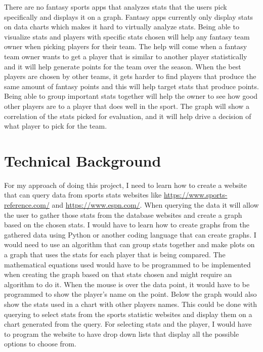 \documentclass[10pt,twocolumn,letterpaper]{article}
\begin{document}
There are no fantasy sports apps that analyzes stats that the users pick specifically and displays it on a graph. Fantasy apps currently only display stats on data charts which makes it hard to virtually analyze stats. Being able to visualize stats and players with specific stats chosen will help any fantasy team owner when picking players for their team. The help will come when a fantasy team owner wants to get a player that is similar to another player statistically and it will help generate points for the team over the season. When the best players are chosen by other teams, it gets harder to find players that produce the same amount of fantasy points and this will help target stats that produce points. Being able to group important stats together will help the owner to see how good other players are to a player that does well in the sport. The graph will show a correlation of the stats picked for evaluation, and it will help drive a decision of what player to pick for the team. 

\section{Technical Background}
\label{sec:tech background}

For my approach of doing this project, I need to learn how to create a website that can query data from sports stats websites like \url{https://www.sports-reference.com/} and
\url{https://www.espn.com/}. When querying the data it will allow the user to gather those stats from the database websites and create a graph based on the chosen stats. I would have to learn how to create graphs from the gathered data using Python or another coding language that can create graphs. I would need to use an algorithm that can group stats together and make plots on a graph that uses the stats for each player that is being compared. The mathematical equations used would have to be programmed to be implemented when creating the graph based on that stats chosen and might require an algorithm to do it. When the mouse is over the data point, it would have to be programmed to show the player's name on the point. Below the graph would also show the stats used in a chart with other players names. This could be done with querying to select stats from the sports statistic websites and display them on a chart generated from the query. For selecting stats and the player, I would have to program the website to have drop down lists that display all the possible options to choose from.
\end{document}
